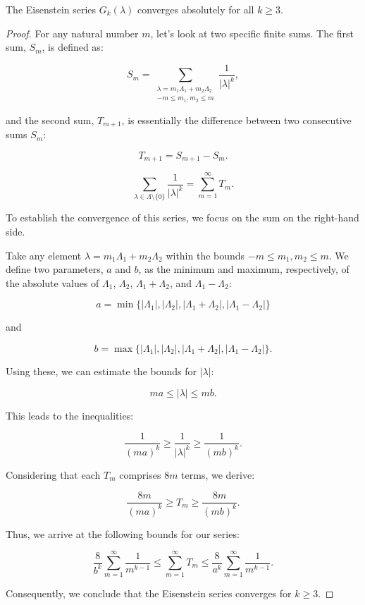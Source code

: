 \begin{proposition}\label{0.1.3.10}
    The Eisenstein series $G_{k}(\lambda)$ converges absolutely for all $k \geq 3$. 
    
    
    \begin{proof}
For any natural number \( m \), let's look at two specific finite sums. The first sum, \( S_m \), is defined as:

\[
S_m = \sum_{\substack{\lambda = m_1 \Lambda_1 + m_2 \Lambda_2 \\ -m \leq m_1, m_2 \leq m}} \frac{1}{|\lambda|^k},
\]

and the second sum, \( T_{m+1} \), is essentially the difference between two consecutive sums \( S_m \):

\[
T_{m+1} = S_{m+1} - S_m.
\]


\[
\sum_{\lambda \in \Lambda \setminus \{0\}} \frac{1}{|\lambda|^k} = \sum_{m=1}^{\infty} T_m.
\]

To establish the convergence of this series, we focus on the sum on the right-hand side.

Take any element \( \lambda = m_1 \Lambda_1 + m_2 \Lambda_2 \) within the bounds \( -m \leq m_1, m_2 \leq m \). We define two parameters, \( a \) and \( b \), as the minimum and maximum, respectively, of the absolute values of \( \Lambda_1 \), \( \Lambda_2 \), \( \Lambda_1 + \Lambda_2 \), and \( \Lambda_1 - \Lambda_2 \):

\[
a = \min \{ |\Lambda_1|, |\Lambda_2|, |\Lambda_1 + \Lambda_2|, |\Lambda_1 - \Lambda_2| \}
\]

and

\[
b = \max \{ |\Lambda_1|, |\Lambda_2|, |\Lambda_1 + \Lambda_2|, |\Lambda_1 - \Lambda_2| \}.
\]

Using these, we can estimate the bounds for \( |\lambda| \):

\[
m a \leq |\lambda| \leq m b.
\]

This leads to the inequalities:

\[
\frac{1}{(m a)^k} \geq \frac{1}{|\lambda|^k} \geq \frac{1}{(m b)^k}.
\]

Considering that each \( T_m \) comprises \( 8m \) terms, we derive:

\[
\frac{8 m}{(m a)^k} \geq T_m \geq \frac{8 m}{(m b)^k}.
\]

Thus, we arrive at the following bounds for our series:

\[
\frac{8}{b^k} \sum_{m=1}^{\infty} \frac{1}{m^{k-1}} \leq \sum_{m=1}^{\infty} T_m \leq \frac{8}{a^k} \sum_{m=1}^{\infty} \frac{1}{m^{k-1}}.
\]

Consequently, we conclude that the Eisenstein series converges for \( k \geq 3 \). 
\end{proof}
\end{proposition}

